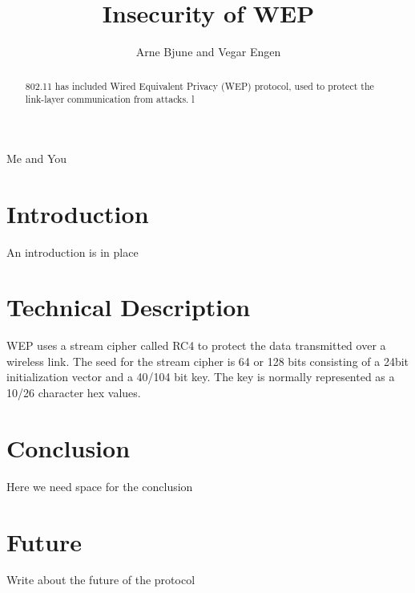 \documentclass[twocolumn]{IEEEtran}
\begin{document}
\title{Insecurity of WEP}


\author{Arne Bjune and Vegar Engen}

{Me and You}

\maketitle

\begin{abstract}
802.11 has included Wired Equivalent Privacy (WEP) protocol, used to protect the link-layer communication from attacks.  l
\end{abstract}

\section {Introduction}
\label{sec:introduction}

An introduction is in place




\section {Technical Description}
\label{sec:technical_description}

WEP uses a stream cipher called RC4 to protect the data transmitted over a wireless link. The seed for the stream cipher is 64 or 128 bits consisting of a 24bit initialization vector and a 40/104 bit key. The key is normally represented as a 10/26 character hex values.




\section {Conclusion}
\label{sec:conclusion}

Here we need space for the conclusion



\section {Future}
\label{sec:future}

Write about the future of the protocol






\end{document}
